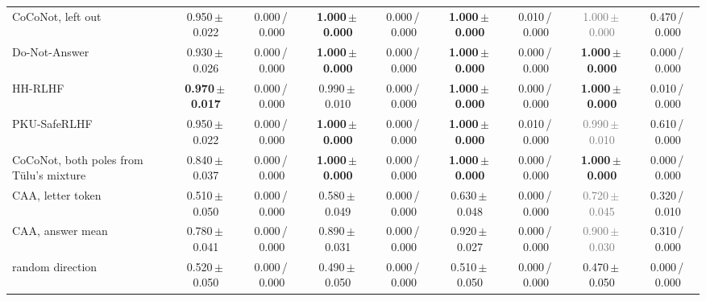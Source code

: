 \begin{tabular}{@{}lcccccccc@{}}
CoCoNot, left out & 0.950\,{\scriptsize$\pm$\,0.022} & {\scriptsize 0.000\,/\,0.000} & \textbf{1.000\,{\scriptsize$\pm$\,0.000}} & {\scriptsize 0.000\,/\,0.000} & \textbf{1.000\,{\scriptsize$\pm$\,0.000}} & {\scriptsize 0.010\,/\,0.000} & \textcolor{gray}{1.000\,{\scriptsize$\pm$\,0.000}} & {\scriptsize 0.470\,/\,0.000} \\
Do-Not-Answer & 0.930\,{\scriptsize$\pm$\,0.026} & {\scriptsize 0.000\,/\,0.000} & \textbf{1.000\,{\scriptsize$\pm$\,0.000}} & {\scriptsize 0.000\,/\,0.000} & \textbf{1.000\,{\scriptsize$\pm$\,0.000}} & {\scriptsize 0.000\,/\,0.000} & \textbf{1.000\,{\scriptsize$\pm$\,0.000}} & {\scriptsize 0.000\,/\,0.000} \\
HH-RLHF & \textbf{0.970\,{\scriptsize$\pm$\,0.017}} & {\scriptsize 0.000\,/\,0.000} & 0.990\,{\scriptsize$\pm$\,0.010} & {\scriptsize 0.000\,/\,0.000} & \textbf{1.000\,{\scriptsize$\pm$\,0.000}} & {\scriptsize 0.000\,/\,0.000} & \textbf{1.000\,{\scriptsize$\pm$\,0.000}} & {\scriptsize 0.010\,/\,0.000} \\
PKU-SafeRLHF & 0.950\,{\scriptsize$\pm$\,0.022} & {\scriptsize 0.000\,/\,0.000} & \textbf{1.000\,{\scriptsize$\pm$\,0.000}} & {\scriptsize 0.000\,/\,0.000} & \textbf{1.000\,{\scriptsize$\pm$\,0.000}} & {\scriptsize 0.010\,/\,0.000} & \textcolor{gray}{0.990\,{\scriptsize$\pm$\,0.010}} & {\scriptsize 0.610\,/\,0.000} \\
CoCoNot, both poles from T\"ulu's mixture & 0.840\,{\scriptsize$\pm$\,0.037} & {\scriptsize 0.000\,/\,0.000} & \textbf{1.000\,{\scriptsize$\pm$\,0.000}} & {\scriptsize 0.000\,/\,0.000} & \textbf{1.000\,{\scriptsize$\pm$\,0.000}} & {\scriptsize 0.000\,/\,0.000} & \textbf{1.000\,{\scriptsize$\pm$\,0.000}} & {\scriptsize 0.000\,/\,0.000} \\
CAA, letter token & 0.510\,{\scriptsize$\pm$\,0.050} & {\scriptsize 0.000\,/\,0.000} & 0.580\,{\scriptsize$\pm$\,0.049} & {\scriptsize 0.000\,/\,0.000} & 0.630\,{\scriptsize$\pm$\,0.048} & {\scriptsize 0.000\,/\,0.000} & \textcolor{gray}{0.720\,{\scriptsize$\pm$\,0.045}} & {\scriptsize 0.320\,/\,0.010} \\
CAA, answer mean & 0.780\,{\scriptsize$\pm$\,0.041} & {\scriptsize 0.000\,/\,0.000} & 0.890\,{\scriptsize$\pm$\,0.031} & {\scriptsize 0.000\,/\,0.000} & 0.920\,{\scriptsize$\pm$\,0.027} & {\scriptsize 0.000\,/\,0.000} & \textcolor{gray}{0.900\,{\scriptsize$\pm$\,0.030}} & {\scriptsize 0.310\,/\,0.000} \\
random direction & 0.520\,{\scriptsize$\pm$\,0.050} & {\scriptsize 0.000\,/\,0.000} & 0.490\,{\scriptsize$\pm$\,0.050} & {\scriptsize 0.000\,/\,0.000} & 0.510\,{\scriptsize$\pm$\,0.050} & {\scriptsize 0.000\,/\,0.000} & 0.470\,{\scriptsize$\pm$\,0.050} & {\scriptsize 0.000\,/\,0.000} \\
\bottomrule
\end{tabular}
